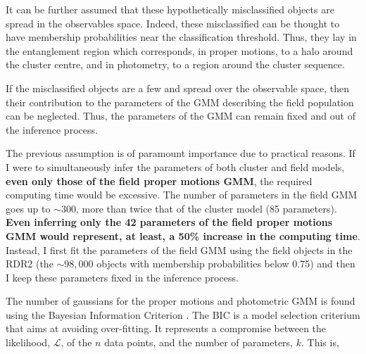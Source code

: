 {\color{blue}
It can be further assumed that these hypothetically misclassified objects are spread in the observables space. Indeed, these misclassified can be thought to have membership probabilities near the classification threshold. Thus, they lay in the entanglement region which corresponds, in proper motions, to a halo around the cluster centre, and in photometry, to a region around the cluster sequence.
}

If the misclassified objects are a few and spread over the observable space, then their contribution to the parameters of the GMM describing the field population can be neglected. Thus, the parameters of the GMM can remain fixed and out of the inference process. 

The previous assumption is of paramount importance due to practical reasons. If I were to simultaneously infer the parameters of both cluster and field models, \textbf{even only those of the field proper motions GMM}, the required computing time would be excessive. The number of parameters in the field GMM goes up to $\sim 300$, more than twice that of the cluster model (85 parameters). \textbf{Even inferring only the 42 parameters of the field proper motions GMM would represent, at least, a 50\% increase in the computing time}. Instead, I first fit the parameters of the field GMM using the field objects in the RDR2 (the $\sim 98,000$ objects with membership probabilities below 0.75) and then I keep these parameters fixed in the inference process.   

The number of gaussians for the proper motions and photometric GMM is found using the Bayesian Information Criterion \cite[BIC,][]{Schwarz1978}. The BIC is a model selection criterium that aims at avoiding over-fitting. It represents a compromise between the likelihood, $\mathcal{L}$, of the $n$ data points, and the number of parameters, $k$. This is,

